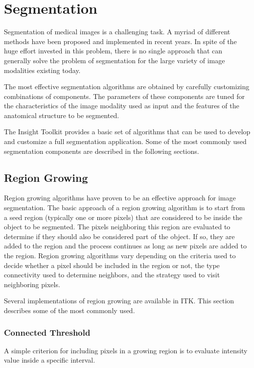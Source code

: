 
\chapter{Segmentation}

Segmentation of medical images is a challenging task. A myriad of different
methods have been proposed and implemented in recent years. In spite of the
huge effort invested in this problem, there is no single approach that can
generally solve the problem of segmentation for the large variety of image
modalities existing today.

The most effective segmentation algorithms are obtained by carefully
customizing combinations of components. The parameters of these components are
tuned for the characteristics of the image modality used as input and the
features of the anatomical structure to be segmented.

The Insight Toolkit provides a basic set of algorithms that can be used to
develop and customize a full segmentation application. Some of the most
commonly used segmentation components are described in the following
sections.


\section{Region Growing}

Region growing algorithms have proven to be an effective approach for image
segmentation. The basic approach of a region growing algorithm is to start
from a seed region (typically one or more pixels) that are considered to be
inside the object to be segmented. The pixels neighboring this region are
evaluated to determine if they should also be considered part of the
object. If so, they are added to the region and the process continues as long
as new pixels are added to the region.  Region growing algorithms vary
depending on the criteria used to decide whether a pixel should be included
in the region or not, the type connectivity used to determine neighbors, and
the strategy used to visit neighboring pixels.

Several implementations of region growing are available in ITK.  This section
describes some of the most commonly used.

\subsection{Connected Threshold}

A simple criterion for including pixels in a growing region is to evaluate
intensity value inside a specific interval.

